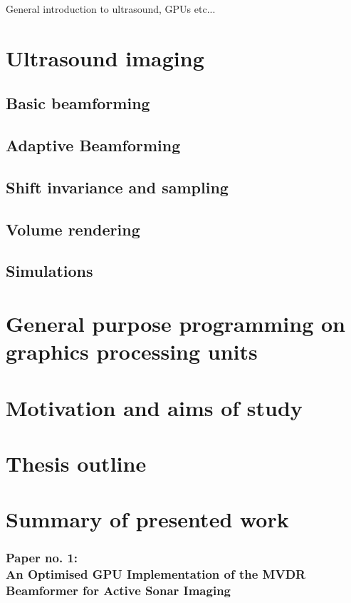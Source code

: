 %

General introduction to ultrasound, GPUs etc...


\section {Ultrasound imaging}
							
\subsection{Basic beamforming}

\subsection{Adaptive Beamforming}
						
\subsection{Shift invariance and sampling}

\subsection{Volume rendering}

\subsection{Simulations}

\section{General purpose programming on graphics processing units}

\section{Motivation and aims of study}
\label{sec:motivationAndAims}

\section{Thesis outline}

\section{Summary of presented work}

\subsubsection{Paper no. 1:\\
An Optimised GPU Implementation of the MVDR Beamformer for Active Sonar Imaging}


